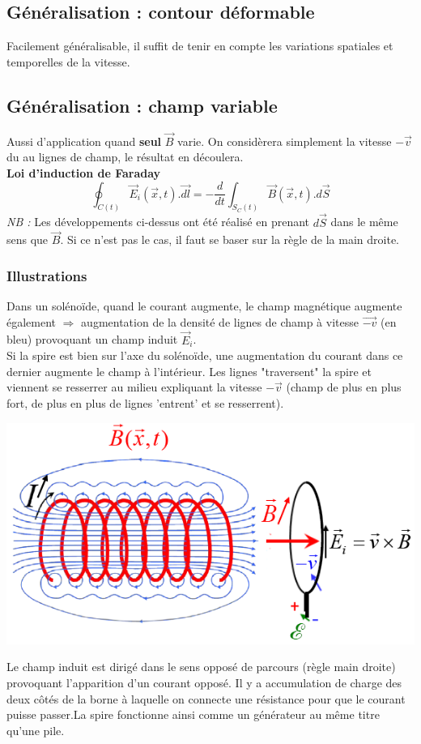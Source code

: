 \documentclass	[11pt, a4paper, openany]{book}
\begin{document}
\subsection{Généralisation : contour déformable}
Facilement généralisable, il suffit de tenir en compte les variations spatiales et temporelles de la vitesse.

\subsection{Généralisation : champ variable}
Aussi d'application quand \textbf{seul} $\vec{B}$ varie. On considèrera simplement la vitesse $-\vec{v}$ du au lignes de champ, le résultat en découlera.\\
\textbf{Loi d'induction de Faraday}
\begin{equation}
\oint_{C(t)} \vec{E}_i(\vec{x}, t).\vec{dl} = -\frac{d}{dt}\int_{S_C(t)} \vec{B}(\vec{x}, t).d\vec{S}
\end{equation}
\textit{NB :} Les développements ci-dessus ont été réalisé en prenant $d\vec{S}$ dans le même sens que $\vec{B}$. Si ce n'est pas le cas, il faut se baser sur la règle de la main droite.

\subsubsection*{Illustrations}
Dans un solénoïde, quand le courant augmente, le champ magnétique augmente également $\Rightarrow$ augmentation de la densité de lignes de champ à vitesse $\vec{-v}$ (en bleu) provoquant un champ induit $\vec{E}_i$.\\
Si la spire est bien sur l'axe du solénoïde, une augmentation du courant dans ce dernier augmente le champ à l'intérieur. Les lignes "traversent" la spire et viennent se resserrer au milieu expliquant la vitesse $-\vec{v}$ (champ de plus en plus fort, de plus en plus de lignes 'entrent' et se resserrent).
\begin{center}
\includegraphics[scale=0.45]{em/image14.png}\\
\end{center}
Le champ induit est dirigé dans le sens opposé de parcours (règle main droite) provoquant l'apparition d'un courant opposé. Il y a accumulation de charge des deux côtés de la borne à laquelle on connecte une résistance pour que le courant puisse passer.La spire fonctionne ainsi comme un générateur au même titre qu'une pile.
\end{document}
